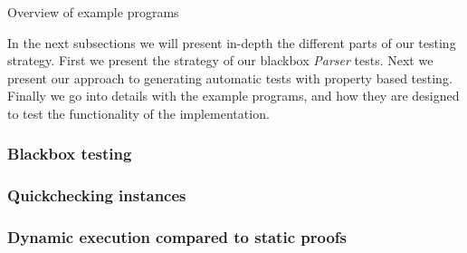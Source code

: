 \begin{table}[h!]

\caption{Overview of example programs}
\label{table:testprograms}
\end{table}

In the next subsections we will present in-depth the different parts of our testing strategy. 
First we present the strategy of our blackbox \textit{Parser} tests. 
Next we present our approach to generating automatic tests with property based testing. 
Finally we go into details with the example programs, and how they are designed to test the functionality of the implementation.

\subsubsection{Blackbox testing}\label{sec:blackbox}


\subsubsection{Quickchecking instances}\label{sec:qc}


\subsubsection{Dynamic execution compared to static proofs}\label{sec:examples}

